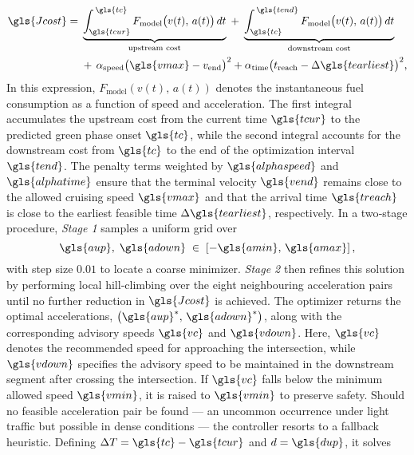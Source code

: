 \begin{equation}
\begin{aligned}
    \gls{Jcost} =\;
    &\underbrace{\int_{\gls{tcur}}^{\,\gls{tc}} F_{\mathrm{model}}\bigl(v(t),\,a(t)\bigr)\,dt}_{\text{upstream cost}}
    \;+\;
    \underbrace{\int_{\gls{tc}}^{\,\gls{tend}} F_{\mathrm{model}}\bigl(v(t),\,a(t)\bigr)\,dt}_{\text{downstream cost}} \\
    &+\, \alpha_{\mathrm{speed}}\bigl(\gls{vmax} - v_{\mathrm{end}}\bigr)^2
    + \alpha_{\mathrm{time}}\bigl(t_{\mathrm{reach}} - \Delta \gls{tearliest}\bigr)^2,
\end{aligned}
\label{eq:costJ_highlevel}
\end{equation}
In this expression, $F_{\mathrm{model}}(v(t),\,a(t))$ denotes the instantaneous fuel consumption as a function of speed and acceleration. The first integral accumulates the upstream cost from the current time $\gls{tcur}$ to the predicted green phase onset $\gls{tc}$, while the second integral accounts for the downstream cost from $\gls{tc}$ to the end of the optimization interval $\gls{tend}$. The penalty terms weighted by $\gls{alphaspeed}$ and $\gls{alphatime}$ ensure that the terminal velocity $\gls{vend}$ remains close to the allowed cruising speed $\gls{vmax}$ and that the arrival time $\gls{treach}$ is close to the earliest feasible time $\Delta\gls{tearliest}$, respectively.
\mynewline
In a two‐stage procedure, \textit{Stage 1} samples a uniform grid over
\begin{equation}
    \gls{aup},\;\gls{adown} \;\in\; \left[-\gls{amin},\,\gls{amax}\right],
\end{equation}
with step size $0.01$ to locate a coarse minimizer. \textit{Stage 2} then refines this solution by performing local hill‐climbing over the eight neighbouring acceleration pairs until no further reduction in $\gls{Jcost}$ is achieved. The optimizer returns the optimal accelerations, $\left(\gls{aup}^*,\,\gls{adown}^*\right)$, along with the corresponding advisory speeds $\gls{vc}$ and $\gls{vdown}$. Here, $\gls{vc}$ denotes the recommended speed for approaching the intersection, while $\gls{vdown}$ specifies the advisory speed to be maintained in the downstream segment after crossing the intersection. If $\gls{vc}$ falls below the minimum allowed speed $\gls{vmin}$, it is raised to $\gls{vmin}$ to preserve safety.
\mynewline
Should no feasible acceleration pair be found --- an uncommon occurrence under light traffic but possible in dense conditions --- the controller resorts to a fallback heuristic. Defining $\Delta T = \gls{tc} - \gls{tcur}$ and $d = \gls{dup}$, it solves
